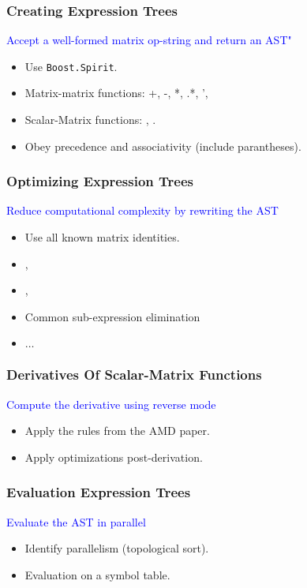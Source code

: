 \begin{frame}
\frametitle{Creating Expression Trees}
%
\begin{center}
\textcolor{blue}{Accept a well-formed matrix op-string and return an AST"}
\end{center}
%
\begin{itemize}
\item Use \texttt{Boost.Spirit}.
\item Matrix-matrix functions: +, -, *, .*, ',\textunderscore{}
\item Scalar-Matrix functions: , .
\item Obey precedence and associativity (include parantheses).
\end{itemize}
%
\end{frame}

\begin{frame}
\frametitle{Optimizing Expression Trees}
%
\begin{center}
\textcolor{blue}{Reduce computational complexity by rewriting the AST}
\end{center}
%
\begin{itemize}
\item Use all known matrix identities.
\item {}, 
\item {}, 
\item Common sub-expression elimination
\item $\ldots{}$
\end{itemize}
%
\end{frame}

\begin{frame}
\frametitle{Derivatives Of Scalar-Matrix Functions}
%
\begin{center}
\textcolor{blue}{Compute the derivative using reverse mode}
\end{center}
%
\begin{itemize}
\item Apply the rules from the AMD paper.
\item Apply optimizations post-derivation.
\end{itemize}
%
\end{frame}

\begin{frame}
\frametitle{Evaluation Expression Trees}
%
\begin{center}
\textcolor{blue}{Evaluate the AST in parallel}
\end{center}
%
\begin{itemize}
\item Identify parallelism (topological sort).
\item Evaluation on a symbol table.
\end{itemize}
%
\end{frame}


